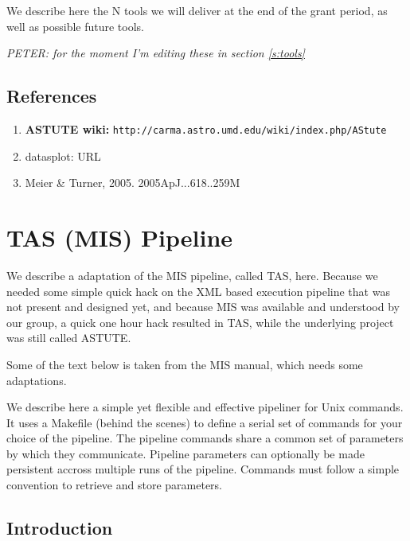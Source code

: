 \documentclass[preprint]{aastex} %
\begin{document}
We describe here the N tools we will deliver at the end of the grant
period, as well as possible future tools.

{\it  PETER: for the moment I'm editing these in section \ref{s:tools}}



\section*{References}

\begin{enumerate}
\item
{\bf ASTUTE wiki:} {\tt  http://carma.astro.umd.edu/wiki/index.php/AStute}

\item
datasplot: URL

\item
Meier \& Turner, 2005. 2005ApJ...618..259M

\end{enumerate}




\chapter{TAS (MIS) Pipeline}

We describe a adaptation of the MIS pipeline, called TAS, here. Because we
needed some simple quick hack on the XML based execution pipeline that was
not present and designed yet, and because MIS was available and understood
by our group, a quick one hour hack resulted in TAS, while the underlying
project was still called ASTUTE.

Some of the text below is taken from the MIS manual, which needs some adaptations.

We describe here a simple yet flexible and effective pipeliner for
Unix commands.  It uses a Makefile (behind the scenes) to define a
serial set of commands for your choice of the pipeline. The pipeline
commands share a common set of parameters by which they communicate.
Pipeline parameters can optionally be made persistent accross multiple
runs of the pipeline. Commands must follow a simple convention to
retrieve and store parameters.



\section{Introduction}
\end{document}
